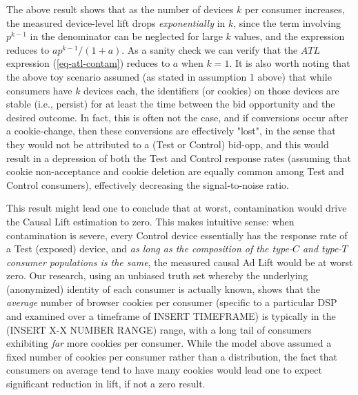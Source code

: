 \documentclass[11pt,a4paper]{article}
\theoremstyle{definition}
\theoremstyle{remark}
\theoremstyle{definition}
\theoremstyle{definition}
\theoremstyle{definition}
\theoremstyle{definition}
\theoremstyle{definition}
\theoremstyle{definition}
\begin{document}
The above result shows that as the number of devices $k$ per consumer increases, the measured device-level lift drops \textit{exponentially} in $k$, since the term involving $p^{k-1}$ in the denominator can be neglected for large $k$ values, and the expression reduces to $a p^{k-1}/(1 + a)$. As a sanity check we can verify that the $ATL$ expression (\ref{eq-atl-contam}) reduces to $a$ when $k=1$. It is also worth noting that the above toy scenario assumed (as stated in assumption 1 above) that while consumers have $k$ devices each, the identifiers (or cookies) on those devices are stable (i.e., persist) for at least the time between the bid opportunity and the desired outcome. In fact, this is often not the case, and if conversions occur after a cookie-change, then these conversions are effectively "lost", in the sense that they would not be attributed to a (Test or Control) bid-opp, and this would result in a depression of both the Test and Control response rates (assuming that cookie non-acceptance and cookie deletion are equally common among Test and Control consumers), effectively decreasing the signal-to-noise ratio.

This result might lead one to conclude that at worst, contamination would drive the Causal Lift estimation to zero. 
This makes intuitive sense: when contamination is severe, every Control device essentially has the response rate of a Test (exposed) device, and \textit{as long as the composition of the type-$C$ and type-$T$ consumer populations is the same}, the measured causal Ad Lift would be at worst zero. Our research, using an unbiased truth set whereby the underlying (anonymized) identity of each consumer is actually known, shows that the {\em average} number of browser cookies per consumer (specific to a particular DSP and examined over a timeframe of INSERT TIMEFRAME) is typically in the (INSERT X-X NUMBER RANGE) range, with a long tail of consumers exhibiting {\em far} more cookies per consumer. While the model above assumed a fixed number of cookies per consumer rather than a distribution, the fact that consumers on average tend to have many cookies would lead one to expect significant reduction in lift, if not a zero result. 
\end{document}
